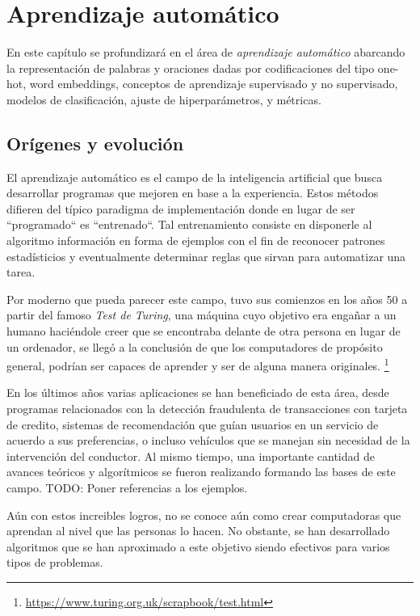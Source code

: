 \chapter{Aprendizaje automático}
\label{ch:lit_ml}

En este capítulo se profundizará en el área de \emph{aprendizaje automático}
abarcando la representación de palabras y oraciones dadas por codificaciones del
tipo one-hot, word embeddings, conceptos de aprendizaje supervisado y no
supervisado, modelos de clasificación, ajuste de hiperparámetros, y métricas.

\section{Orígenes y evolución}

El aprendizaje automático es el campo de la inteligencia artificial que busca
desarrollar programas que mejoren en base a la experiencia. Estos métodos
difieren del típico paradigma de implementación donde en lugar de ser
``programado`` es ``entrenado``. Tal entrenamiento consiste en disponerle al
algoritmo información en forma de ejemplos con el fin de reconocer patrones
estadísticios y eventualmente determinar reglas que sirvan para automatizar una
tarea.

Por moderno que pueda parecer este campo, tuvo sus comienzos en los años 50 a
partir del famoso \emph{Test de Turing}, una máquina cuyo objetivo era engañar a
un humano haciéndole creer que se encontraba delante de otra persona en lugar de
un ordenador, se llegó  a la conclusión de que los computadores de propósito
general, podrían ser capaces de aprender y ser de alguna manera originales.
\footnote{\url{https://www.turing.org.uk/scrapbook/test.html}}

En los últimos años varias aplicaciones se han beneficiado de esta área, desde
programas relacionados con la detección fraudulenta de transacciones con tarjeta
de credito, sistemas de recomendación que guían usuarios en un servicio de
acuerdo a sus preferencias, o incluso vehículos que se manejan sin necesidad de
la intervención del conductor. Al mismo tiempo, una importante cantidad de
avances teóricos y algorítmicos se fueron realizando formando las bases de este
campo. TODO: Poner referencias a los ejemplos.

Aún con estos increibles logros, no se conoce aún como crear computadoras que
aprendan al nivel que las personas lo hacen. No obstante, se han desarrollado
algoritmos que se han aproximado a este objetivo siendo efectivos para varios
tipos de problemas.

